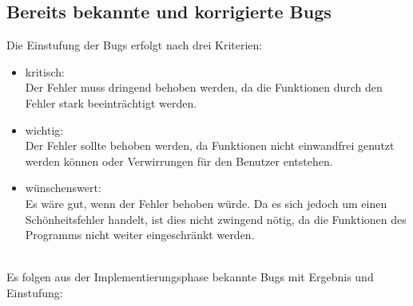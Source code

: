 \documentclass[a4paper]{article}
\begin{document}
\subsection{Bereits bekannte und korrigierte Bugs}
Die Einstufung der Bugs erfolgt nach drei Kriterien:
\begin{itemize}
\item kritisch: \\
Der Fehler muss dringend behoben werden, da die Funktionen durch den Fehler stark beeinträchtigt werden.
\item wichtig: \\
Der Fehler sollte behoben werden, da Funktionen nicht einwandfrei genutzt werden können oder Verwirrungen für den Benutzer entstehen.
\item wünschenswert: \\
Es wäre gut, wenn der Fehler behoben würde. Da es sich jedoch um einen Schönheitsfehler handelt, ist dies nicht zwingend nötig, da die Funktionen des Programms nicht weiter eingeschränkt werden.
\end{itemize}
\ \\
\noindent
Es folgen aus der Implementierungsphase bekannte Bugs mit Ergebnis und Einstufung:
\end{document}
